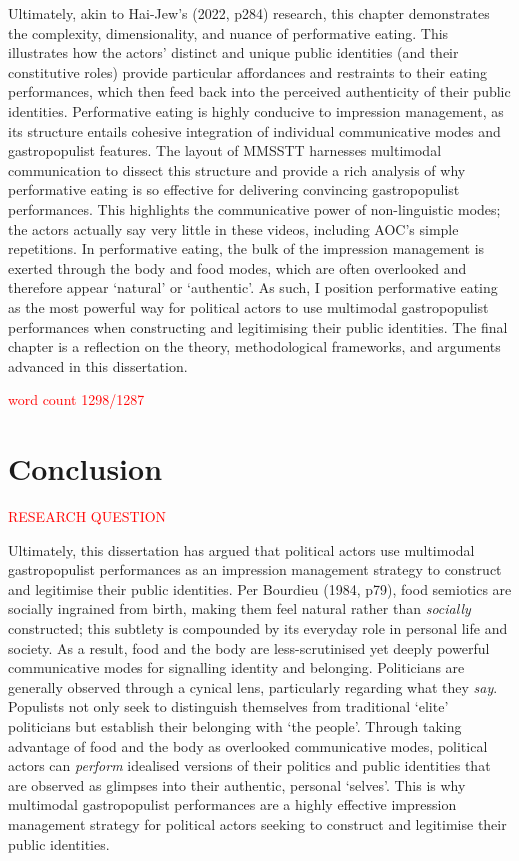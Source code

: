 \documentclass[a4paper, nobind]{templates/ociamthesis}
\begin{document}
Ultimately, akin to Hai-Jew's (2022, p284) research, this chapter demonstrates the complexity, dimensionality, and nuance of performative eating. This illustrates how the actors' distinct and unique public identities (and their constitutive roles) provide particular affordances and restraints to their eating performances, which then feed back into the perceived authenticity of their public identities. Performative eating is highly conducive to impression management, as its structure entails cohesive integration of individual communicative modes and gastropopulist features. The layout of MMSSTT harnesses multimodal communication to dissect this structure and provide a rich analysis of why performative eating is so effective for delivering convincing gastropopulist performances. This highlights the communicative power of non-linguistic modes; the actors actually say very little in these videos, including AOC's simple repetitions. In performative eating, the bulk of the impression management is exerted through the body and food modes, which are often overlooked and therefore appear `natural' or `authentic'. As such, I position performative eating as the most powerful way for political actors to use multimodal gastropopulist performances when constructing and legitimising their public identities. The final chapter is a reflection on the theory, methodological frameworks, and arguments advanced in this dissertation.

\textcolor{red}{word count 1298/1287}

\hypertarget{conclusion}{%
\chapter{Conclusion}\label{conclusion}}

\textcolor{red}{RESEARCH QUESTION}

Ultimately, this dissertation has argued that political actors use multimodal gastropopulist performances as an impression management strategy to construct and legitimise their public identities. Per Bourdieu (1984, p79), food semiotics are socially ingrained from birth, making them feel natural rather than \emph{socially} constructed; this subtlety is compounded by its everyday role in personal life and society. As a result, food and the body are less-scrutinised yet deeply powerful communicative modes for signalling identity and belonging. Politicians are generally observed through a cynical lens, particularly regarding what they \emph{say}. Populists not only seek to distinguish themselves from traditional `elite' politicians but establish their belonging with `the people'. Through taking advantage of food and the body as overlooked communicative modes, political actors can \emph{perform} idealised versions of their politics and public identities that are observed as glimpses into their authentic, personal `selves'. This is why multimodal gastropopulist performances are a highly effective impression management strategy for political actors seeking to construct and legitimise their public identities.
\end{document}
